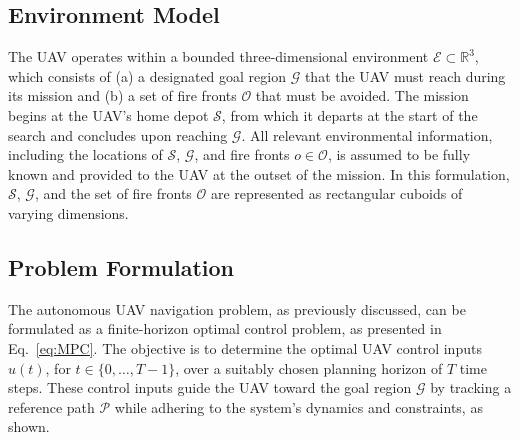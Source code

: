 \subsection{Environment Model} 
\label{ssec:env_model}
The UAV operates within a bounded three-dimensional environment $\mathcal{E} \subset \mathbb{R}^3$, which consists of (a) a designated goal region $\mathcal{G}$ that the UAV must reach during its mission and (b) a set of fire fronts $\mathcal{O}$ that must be avoided. The mission begins at the UAV's home depot $\mathcal{S}$, from which it departs at the start of the search and concludes upon reaching $\mathcal{G}$. All relevant environmental information, including the locations of $\mathcal{S}$, $\mathcal{G}$, and fire fronts $o \in \mathcal{O}$, is assumed to be fully known and provided to the UAV at the outset of the mission. In this formulation, $\mathcal{S}$, $\mathcal{G}$, and the set of fire fronts $\mathcal{O}$ are represented as rectangular cuboids of varying dimensions.

\subsection{Problem Formulation} 
\label{ssec:formulation}

The autonomous UAV navigation problem, as previously discussed, can be formulated as a finite-horizon optimal control problem, as presented in Eq.~\eqref{eq:MPC}. The objective is to determine the optimal UAV control inputs \( u(t) \), for \( t \in \{0, \dots, T-1\} \), over a suitably chosen planning horizon of \( T \) time steps. These control inputs guide the UAV toward the goal region \( \mathcal{G} \) by tracking a reference path \( \mathcal{P} \) while adhering to the system's dynamics and constraints, as shown.



